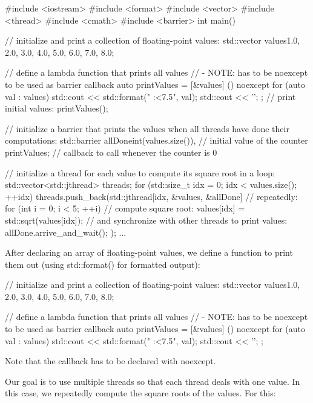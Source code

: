 \begin{cpp}
#include <iostream>
#include <format>
#include <vector>
#include <thread>
#include <cmath>
#include <barrier>
int main()
{
	// initialize and print a collection of floating-point values:
	std::vector values{1.0, 2.0, 3.0, 4.0, 5.0, 6.0, 7.0, 8.0};
	
	// define a lambda function that prints all values
	// - NOTE: has to be noexcept to be used as barrier callback
	auto printValues = [&values] () noexcept{
						for (auto val : values) {
							std::cout << std::format(" {:<7.5}", val);
						}
						std::cout << '\n';
					};
	// print initial values:
	printValues();
	
	// initialize a barrier that prints the values when all threads have done their computations:
	std::barrier allDone{int(values.size()), // initial value of the counter
						 printValues}; // callback to call whenever the counter is 0
		
	// initialize a thread for each value to compute its square root in a loop:
	std::vector<std::jthread> threads;
	for (std::size_t idx = 0; idx < values.size(); ++idx) {
		threads.push_back(std::jthread{[idx, &values, &allDone] {
				// repeatedly:
				for (int i = 0; i < 5; ++i) {
					// compute square root:
					values[idx] = std::sqrt(values[idx]);
					// and synchronize with other threads to print values:
					allDone.arrive_and_wait();
				}
		}});
	}
	...
}
\end{cpp}

After declaring an array of floating-point values, we define a function to print them out (using std::format() for formatted output):

\begin{cpp}
// initialize and print a collection of floating-point values:
std::vector values{1.0, 2.0, 3.0, 4.0, 5.0, 6.0, 7.0, 8.0};

// define a lambda function that prints all values
// - NOTE: has to be noexcept to be used as barrier callback
auto printValues = [&values] () noexcept{
	for (auto val : values) {
		std::cout << std::format(" {:<7.5}", val);
	}
	std::cout << '\n';
};
\end{cpp}

Note that the callback has to be declared with noexcept.

Our goal is to use multiple threads so that each thread deals with one value. In this case, we repeatedly compute the square roots of the values. For this:

